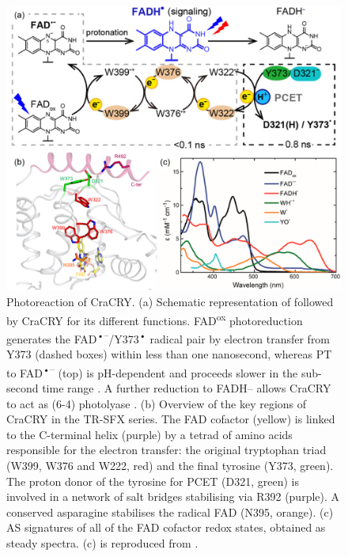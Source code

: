 \begin{figure}[H]
  \centering
  \includegraphics[width=\textwidth]{images/cracry/Photocycle_CraCRY.pdf}
  \hfill
  \caption{Photoreaction of CraCRY. (a) Schematic representation of followed by CraCRY for its different functions. FAD\textsuperscript{ox} photoreduction generates the FAD\textsuperscript{•–}/Y373\textsuperscript{•} radical pair by electron transfer from Y373 (dashed boxes) within less than one nanosecond, whereas PT to FAD\textsuperscript{•–} (top) is pH-dependent and proceeds slower in the sub-second time range \parencite{lacombatUltrafastOxidationTyrosine2019}. A further reduction to FADH– allows CraCRY to act as (6-4) photolyase \parencite{franzStructureBifunctionalCryptochrome2018}. (b) Overview of the key regions of CraCRY in the TR-SFX series. The FAD cofactor (yellow) is linked to the  C-terminal helix (purple) by a tetrad of amino acids responsible for the electron transfer: the original tryptophan triad (W399, W376 and W222, red) and the final tyrosine (Y373, green). The proton donor of the tyrosine for PCET (D321, green) is involved in a network of salt bridges stabilising  via R392 (purple). A conserved asparagine stabilises the radical FAD (N395, orange). (c) AS signatures of all of the FAD cofactor redox states, obtained as steady spectra. (c) is reproduced from \parencite{lacombatUltrafastOxidationTyrosine2019}.}\label{fig:CraCRY_photoreaction}
\end{figure}

